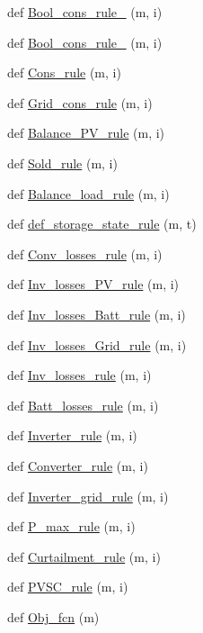 \begin{DoxyCompactItemize}
def \mbox{\hyperlink{namespace_l_p_a3d3409e76da5b5e02801ea5ba73dc7f1}{Bool\+\_\+cons\+\_\+rule\+\_}} (m, i)
\item 
def \mbox{\hyperlink{namespace_l_p_a9dda8c2199a8eba50bb01cdc929d37e5}{Bool\+\_\+cons\+\_\+rule\+\_}} (m, i)
\item 
def \mbox{\hyperlink{namespace_l_p_ab91a1eb4aff41e831d022f2ededb6dcd}{Cons\+\_\+rule}} (m, i)
\item 
def \mbox{\hyperlink{namespace_l_p_a0aaf8565592895b8afeffcd33c6452c7}{Grid\+\_\+cons\+\_\+rule}} (m, i)
\item 
def \mbox{\hyperlink{namespace_l_p_aaa5c98af22d032fe4789fbf07ff0f7fb}{Balance\+\_\+\+P\+V\+\_\+rule}} (m, i)
\item 
def \mbox{\hyperlink{namespace_l_p_a1b5e92f8502a9cbcd92198d9857a6d83}{Sold\+\_\+rule}} (m, i)
\item 
def \mbox{\hyperlink{namespace_l_p_a7995ecb2641ea88b0911ec2aeca541ca}{Balance\+\_\+load\+\_\+rule}} (m, i)
\item 
def \mbox{\hyperlink{namespace_l_p_a063633601bec91a8e0bf87f9bb0aa6ab}{def\+\_\+storage\+\_\+state\+\_\+rule}} (m, t)
\item 
def \mbox{\hyperlink{namespace_l_p_aae69104b239c580c31f61daa9845e39e}{Conv\+\_\+losses\+\_\+rule}} (m, i)
\item 
def \mbox{\hyperlink{namespace_l_p_ad920676464ef0ff1688919b8c81ab873}{Inv\+\_\+losses\+\_\+\+P\+V\+\_\+rule}} (m, i)
\item 
def \mbox{\hyperlink{namespace_l_p_ab5baa41892f3e1bd503c0259eb081d7c}{Inv\+\_\+losses\+\_\+\+Batt\+\_\+rule}} (m, i)
\item 
def \mbox{\hyperlink{namespace_l_p_aec58b73a9e0936ba025185e9beac66be}{Inv\+\_\+losses\+\_\+\+Grid\+\_\+rule}} (m, i)
\item 
def \mbox{\hyperlink{namespace_l_p_a8e04fc6d66eb06e7b8673fc28098b0bb}{Inv\+\_\+losses\+\_\+rule}} (m, i)
\item 
def \mbox{\hyperlink{namespace_l_p_a25895a3a7f6a2f6e7a24db67779a7232}{Batt\+\_\+losses\+\_\+rule}} (m, i)
\item 
def \mbox{\hyperlink{namespace_l_p_ac92c34a0b08510b70b35e0d5c70443ee}{Inverter\+\_\+rule}} (m, i)
\item 
def \mbox{\hyperlink{namespace_l_p_ab2b4ae6c314b779015922d5635090710}{Converter\+\_\+rule}} (m, i)
\item 
def \mbox{\hyperlink{namespace_l_p_a8faf34cc39e6767513fc5a8957d2611f}{Inverter\+\_\+grid\+\_\+rule}} (m, i)
\item 
def \mbox{\hyperlink{namespace_l_p_a12fc2729e8471d6cd254664a9bd94390}{P\+\_\+max\+\_\+rule}} (m, i)
\item 
def \mbox{\hyperlink{namespace_l_p_a785fe683f3e79df7f8a0234fd7bae5b7}{Curtailment\+\_\+rule}} (m, i)
\item 
def \mbox{\hyperlink{namespace_l_p_acf9197fcddcdd5c3bd324a1227235ee2}{P\+V\+S\+C\+\_\+rule}} (m, i)
\item 
def \mbox{\hyperlink{namespace_l_p_a073ca69e2d3f4650b19e9f703f0e3295}{Obj\+\_\+fcn}} (m)
\end{DoxyCompactItemize}


